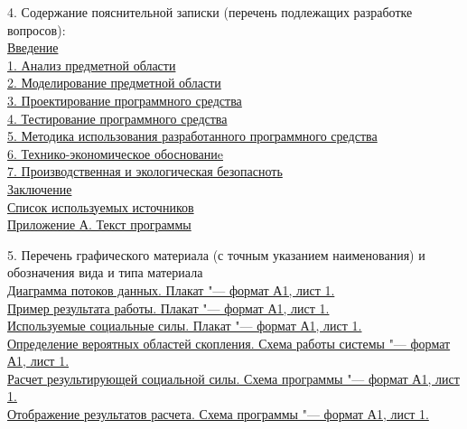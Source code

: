 {  \small{4. Содержание пояснительной записки (перечень подлежащих разработке вопросов):} \\[1em]
  \uline{\small{Введение}}\lineunderscore\\
  \uline{\small{1. Анализ предметной области}}\lineunderscore\\
  \uline{\small{2. Моделирование предметной области}}\lineunderscore\\
  \uline{\small{3. Проектирование программного средства}}\lineunderscore\\
  \uline{\small{4. Тестирование программного средства}}\lineunderscore\\
  \uline{\small{5. Методика использования разработанного программного средства}}\lineunderscore\\
  \uline{\small{6. Технико-экономическое обоснованиe}}\lineunderscore\\
  \uline{\small{7. Производственная и экологическая безопасноть}}\lineunderscore\\
  \uline{\small{Заключение}}\lineunderscore\\
  \uline{\small{Список используемых источников}}\lineunderscore\\
  \uline{\small{Приложение А. Текст программы}}\lineunderscore

  \clearpage
  \thispagestyle{empty}

  \small{5. Перечень графического материала (с точным указанием наименования) и обозначения вида и типа материала} \\
  \uline{\small{Диаграмма потоков данных. Плакат "--- формат А1, лист 1.}}\lineunderscore\\
  \uline{\small{Пример результата работы. Плакат "--- формат А1, лист 1.}}\lineunderscore\\
  \uline{\small{Используемые социальные силы. Плакат "--- формат А1, лист 1.}}\lineunderscore\\
  \uline{\small{Определение вероятных областей скопления. Схема работы системы "--- формат А1, лист 1.}}\lineunderscore\\
  \uline{\small{Расчет результирующей социальной силы. Схема программы "--- формат А1, лист 1.}}\lineunderscore\\
  \uline{\small{Отображение результатов расчета. Схема программы "--- формат А1, лист 1.}}\lineunderscore\\
  \lineunderscore\\
  \lineunderscore

  \vspace{1em}

}
